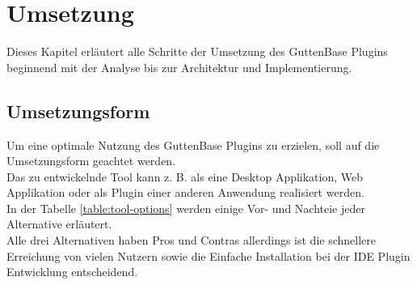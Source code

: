 \chapter{Umsetzung}
Dieses Kapitel erläutert alle Schritte der Umsetzung des GuttenBase Plugins beginnend mit der Analyse bis zur Architektur und Implementierung.

\section{Umsetzungsform}
Um eine optimale Nutzung des GuttenBase Plugins zu erzielen, soll auf die Umsetzungsform geachtet werden.\\
Das zu entwickelnde Tool kann z. B. als eine Desktop Applikation, Web Applikation oder als Plugin einer anderen Anwendung realisiert werden.\\
In der Tabelle \ref{table:tool-options} werden einige Vor- und Nachteie jeder Alternative erläutert. \\
Alle drei Alternativen haben Pros und Contras allerdings ist die schnellere Erreichung von vielen Nutzern sowie die Einfache Installation bei der IDE Plugin Entwicklung entscheidend. 
